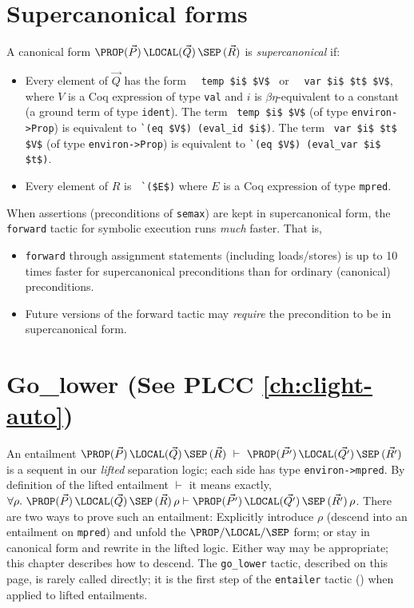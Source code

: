 \documentclass[12pt,fleqn,openany,oneside,showtrims]{memoir}
\newcommand{\ychapter}[2]{\chapter[#1]{#1 \hfill \normalsize #2}}
\begin{document}
\ychapter{Supercanonical forms}{}
\label{refcard:supercanonical}

A canonical form \(\PROP (\vec{P})\,\LOCAL(\vec{Q})\,\SEP\,(\vec{R})\)
is \emph{supercanonical} if:
\begin{itemize}
\item Every element of $\vec{Q}$ has the form
~~\lstinline{temp $i$ $V$}~
or ~~\lstinline{var $i$ $t$ $V$},\newline
where $V$ is a Coq expression of type \lstinline{val}
and $i$ is $\beta\eta$-equivalent to 
a constant (a ground term of type \lstinline{ident}).
The term ~\lstinline{temp $i$ $V$}
(of type \lstinline{environ->Prop})
is equivalent to 
\lstinline{`(eq $V$) (eval_id $i$)}.
The term ~\lstinline{var $i$ $t$ $V$}
(of type \lstinline{environ->Prop})
is equivalent to 
\lstinline{`(eq $V$) (eval_var $i$ $t$)}.

\item Every element of $R$ is
~\lstinline{`($E$)} where $E$ is a Coq expression of type \lstinline{mpred}.
\end{itemize}

When assertions (preconditions of \lstinline{semax}) are kept
in supercanonical form, the \lstinline{forward} tactic
for symbolic execution runs \emph{much} faster.  That is,
\begin{itemize}
\item \lstinline{forward} through assignment statements
(including loads/stores) is up to 10 times faster for supercanonical
preconditions than for ordinary (canonical) preconditions.
\item Future versions of the forward tactic may \emph{require}
the precondition to be in supercanonical form.
\end{itemize}

\ychapter{Go\_lower}{(See PLCC \autoref{ch:clight-auto})}
\label{refcard:go-lower}
An entailment 
$\PROP (\vec{P})\,\LOCAL(\vec{Q})\,\SEP\,(\vec{R})~
\vdash ~
\PROP (\vec{P'})\,\LOCAL(\vec{Q'})\,\SEP\,(\vec{R'})
$
is a sequent in our \emph{lifted} separation logic;
each side
has type \lstinline{environ->mpred}.  By definition of the lifted
entailment $\vdash$ it means exactly,\linebreak
$\forall \rho.~
\PROP (\vec{P})\,\LOCAL(\vec{Q})\,\SEP\,(\vec{R})\,\rho
\vdash 
\PROP (\vec{P'})\,\LOCAL(\vec{Q'})\,\SEP\,(\vec{R'})\,\rho
$. \linebreak
There are two ways to prove such an entailment:
Explicitly introduce $\rho$ (descend
into an entailment on \lstinline{mpred}) and 
unfold the $\PROP/\LOCAL/\SEP$ form; 
or stay in canonical form and rewrite in
the lifted logic.
Either way may be appropriate; this chapter describes
how to descend.
The \lstinline{go_lower} tactic, described on this page,
is rarely called directly; it is the first step of the
\lstinline{entailer} tactic ()
when applied to lifted entailments.
\end{document}
